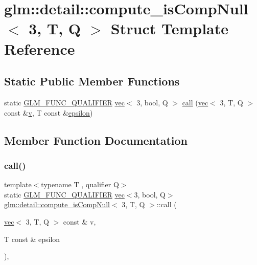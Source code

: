 \hypertarget{structglm_1_1detail_1_1compute__is_comp_null_3_013_00_01_t_00_01_q_01_4}{}\section{glm\+:\+:detail\+:\+:compute\+\_\+is\+Comp\+Null$<$ 3, T, Q $>$ Struct Template Reference}
\label{structglm_1_1detail_1_1compute__is_comp_null_3_013_00_01_t_00_01_q_01_4}
\subsection*{Static Public Member Functions}
\begin{DoxyCompactItemize}
\item 
static \mbox{\hyperlink{setup_8hpp_a33fdea6f91c5f834105f7415e2a64407}{G\+L\+M\+\_\+\+F\+U\+N\+C\+\_\+\+Q\+U\+A\+L\+I\+F\+I\+ER}} \mbox{\hyperlink{structglm_1_1vec}{vec}}$<$ 3, bool, Q $>$ \mbox{\hyperlink{structglm_1_1detail_1_1compute__is_comp_null_3_013_00_01_t_00_01_q_01_4_a2bb0d3fb0e8d0a8c9e4571e92102f1c3}{call}} (\mbox{\hyperlink{structglm_1_1vec}{vec}}$<$ 3, T, Q $>$ const \&\mbox{\hyperlink{_s_d_l__opengl_8h_a10a82eabcb59d2fcd74acee063775f90}{v}}, T const \&\mbox{\hyperlink{group__gtc__constants_ga2a1e57fc5592b69cfae84174cbfc9429}{epsilon}})
\end{DoxyCompactItemize}


\subsection{Member Function Documentation}
\mbox{\label{structglm_1_1detail_1_1compute__is_comp_null_3_013_00_01_t_00_01_q_01_4_a2bb0d3fb0e8d0a8c9e4571e92102f1c3}} 
\subsubsection{\texorpdfstring{call()}{call()}}
{\footnotesize\ttfamily template$<$typename T , qualifier Q$>$ \\
static \mbox{\hyperlink{setup_8hpp_a33fdea6f91c5f834105f7415e2a64407}{G\+L\+M\+\_\+\+F\+U\+N\+C\+\_\+\+Q\+U\+A\+L\+I\+F\+I\+ER}} \mbox{\hyperlink{structglm_1_1vec}{vec}}$<$3, bool, Q$>$ \mbox{\hyperlink{structglm_1_1detail_1_1compute__is_comp_null}{glm\+::detail\+::compute\+\_\+is\+Comp\+Null}}$<$ 3, T, Q $>$\+::call (\begin{DoxyParamCaption}\item[{\mbox{\hyperlink{structglm_1_1vec}{vec}}$<$ 3, T, Q $>$ const \&}]{v,  }\item[{T const \&}]{epsilon }\end{DoxyParamCaption})\hspace{0.3cm}{\ttfamily [inline]}, {\ttfamily [static]}}




